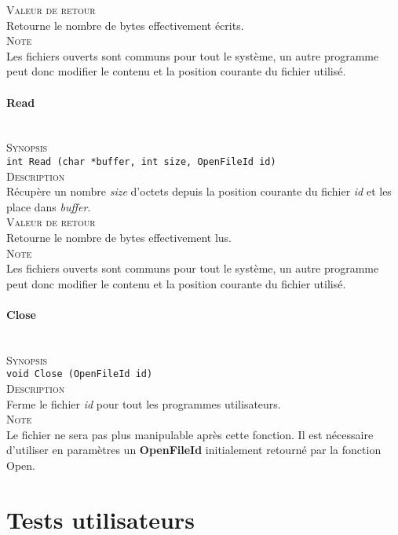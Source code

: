 \documentclass{report}
\newcommand{\myparagraph}[1]{\paragraph*{#1}\mbox{}\\}
\begin{document}
\textsc{Valeur de retour}\\
	Retourne le nombre de bytes effectivement écrits.\\	

\textsc{Note}\\
	Les fichiers ouverts sont communs pour tout le système, un autre programme peut donc modifier le contenu et la position courante du fichier utilisé.\\	
\myparagraph{Read}

\textsc{Synopsis}\\	
	\texttt{int Read (char *buffer, int size, OpenFileId id)}\\
	
\textsc{Description}\\
	Récupère un nombre \textit{size} d'octets depuis la position courante du fichier \textit{id} et les place dans \textit{buffer}.  \\	

\textsc{Valeur de retour}\\
	Retourne le nombre de bytes effectivement lus.\\
	
\textsc{Note}\\
	Les fichiers ouverts sont communs pour tout le système, un autre programme peut donc modifier le contenu et la position courante du fichier utilisé.\\	
\myparagraph{Close}

\textsc{Synopsis}\\	
	\texttt{void Close (OpenFileId id)}\\
	
\textsc{Description}\\
	Ferme le fichier \textit{id} pour tout les programmes utilisateurs.  \\	
	
\textsc{Note}\\
	Le fichier ne sera pas plus manipulable après cette fonction. Il est nécessaire d'utiliser en paramètres un \textbf{OpenFileId} initialement retourné par la fonction Open.\\	
	

\section*{Tests utilisateurs}
\end{document}
